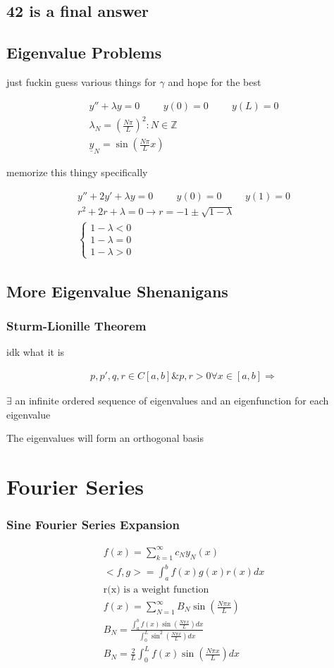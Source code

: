 \documentclass[fleqn]{report}
\newcommand{\hp}{\hspace{1cm}}
\newcommand{\equations} [1] {
\begin{gather*}
#1
\end{gather*}
}
\begin{document}
\section{42 is a final answer}

\section{Eigenvalue Problems}
just fuckin guess various things for $\gamma$ and hope for the best
\equations{
y'' + \lambda y = 0
\hp
y(0) = 0
\hp
y(L) = 0
\\
\lambda_N= \left( \frac{N \pi}{L} \right)^2 : N \in \mathbb{Z}
\\
\underline y_N = \sin (\frac{N \pi}{L}x)
}
memorize this thingy specifically

\equations{
y'' + 2y' + \lambda y = 0 \hp y(0) = 0 \hp y(1) = 0
\\
r^2 + 2r + \lambda = 0 \rightarrow r = -1 \pm \sqrt{1 - \lambda }
\\
\begin{cases}
1 - \lambda < 0
\\
1 - \lambda = 0
\\
1 - \lambda > 0
\end{cases}
}

\section{More Eigenvalue Shenanigans}

\subsection{Sturm-Lionille Theorem}
idk what it is

\equations{
p, p', q, r \in C[a, b] \&
p, r > 0 \forall x \in [a, b]
\Rightarrow
}
$\exists$ an infinite ordered sequence of eigenvalues and an eigenfunction for each eigenvalue

The eigenvalues will form an orthogonal basis

\chapter{Fourier Series}
\subsection{Sine Fourier Series Expansion}
\equations{
f(x) = \sum^\infty_{k = 1} c_N y_N (x)
\\
<f, g> = \int^b_a f(x) g(x) r(x) dx
\\
\textrm{r(x) is a weight function}
\\
f(x) = \sum^\infty_{N = 1} B_N \sin(\frac{N \pi x}{L})
\\
B_N = \frac{
\int^b_a f(x) \sin(\frac{N \pi x}{L}) dx
}
{
\int^L_0 \sin^2(\frac{N \pi x}{L}) dx
}
\\
B_N = \frac{2}{L} \int^L_0 f(x) \sin(\frac{N \pi x}{L}) dx
}
\end{document}

